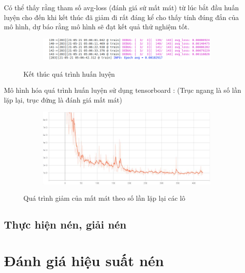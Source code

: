 \newpage
Có thể thấy rằng tham số avg-loss (đánh giá sứ mất mát) từ lúc 
bắt đầu huấn luyện cho đến khi kết thúc đã giảm đi rất đáng kể
cho thấy tính đúng đắn của mô hình, dự báo rằng mô hình sẽ đạt kết
quả thử nghiệm tốt.

\begin{figure}
    \begin{subfigure}{0.8\textwidth}
        \includegraphics[width=1.\linewidth]{Chapters/items/colab2.jpg}
        \caption{}
        \label{fig: colab2}
    \end{subfigure}
    \caption{Kết thúc quá trình huấn luyện}
\end{figure}

Mô hình hóa quá trình huấn luyện sử dụng tensorboard :
(Trục ngang là số lần lặp lại, trục đứng là đánh giá mất mát)

\begin{figure}
    \begin{subfigure}{0.8\textwidth}
        \includegraphics[width=1.\linewidth]{Chapters/items/visualizeTraining.jpg}
        \caption{}
        \label{fig: visualize}
    \end{subfigure}
    \caption{Quá trình giảm của mất mát theo số lần lặp lại các lô}
\end{figure}

\subsection{Thực hiện nén, giải nén}
\section{Đánh giá hiệu suất nén}


